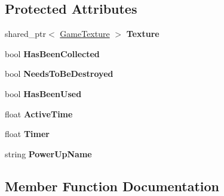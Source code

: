 \subsection*{Protected Attributes}
\begin{DoxyCompactItemize}
\item 
\mbox{\label{class_engine_1_1_core_1_1_power_up_base_aa54bef6e0787bb0b1cc9c11511d53698}} 
shared\+\_\+ptr$<$ \hyperlink{class_engine_1_1_core_1_1_game_texture}{Game\+Texture} $>$ {\bfseries Texture}
\item 
\mbox{\label{class_engine_1_1_core_1_1_power_up_base_af8eee8047d8b8cc862cd2f2a7b478d7b}} 
bool {\bfseries Has\+Been\+Collected}
\item 
\mbox{\label{class_engine_1_1_core_1_1_power_up_base_a2bedbc9b886812f6817857b3de149c31}} 
bool {\bfseries Needs\+To\+Be\+Destroyed}
\item 
\mbox{\label{class_engine_1_1_core_1_1_power_up_base_a965113b66852a062cfc3c9c8c0311d76}} 
bool {\bfseries Has\+Been\+Used}
\item 
\mbox{\label{class_engine_1_1_core_1_1_power_up_base_ac31bcfc632da55934fb4a30ba6e45233}} 
float {\bfseries Active\+Time}
\item 
\mbox{\label{class_engine_1_1_core_1_1_power_up_base_a8584876cda80e9062ab45f8b0b8e8b31}} 
float {\bfseries Timer}
\item 
\mbox{\label{class_engine_1_1_core_1_1_power_up_base_a7639465b4ce58ded85e2853b31497424}} 
string {\bfseries Power\+Up\+Name}
\end{DoxyCompactItemize}


\subsection{Member Function Documentation}
\mbox{\label{class_engine_1_1_core_1_1_power_up_base_a5d145e5909ed25fb656416fe10ba7052}} 
